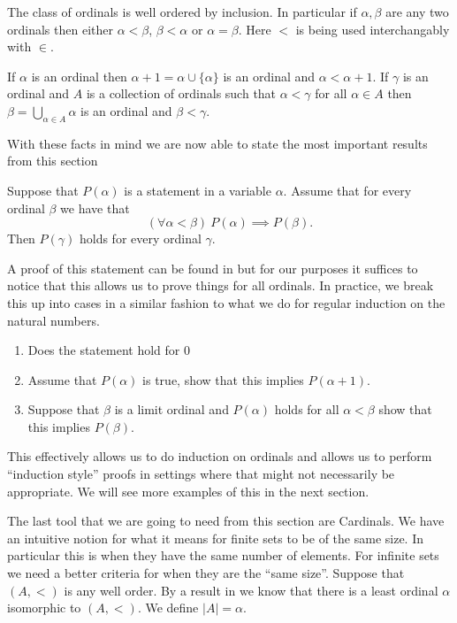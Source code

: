\begin{lemma}
  The class of ordinals is well ordered by inclusion. In particular if
  $\alpha, \beta$ are any two ordinals then either $\alpha < \beta$, $\beta
  < \alpha$ or $\alpha = \beta$. Here $<$ is being used interchangably with
  $\in$.
\end{lemma}

\begin{lemma}
  If $\alpha$ is an ordinal then $\alpha + 1 = \alpha \cup \{\alpha\}$ is an
  ordinal and $\alpha < \alpha + 1$. If $\gamma$ is an ordinal and $A$ is
  a collection of ordinals such that $\alpha < \gamma$ for all $\alpha \in A$ 
  then $\beta = \bigcup_{\alpha \in A} \alpha$ is an ordinal and $\beta
  < \gamma$.
\end{lemma}

With these facts in mind we are now able to state the most important results
from this section

\begin{thm}
  Suppose that $P(\alpha)$ is a statement in a variable $\alpha$. Assume that
  for every ordinal $\beta$ we have that
   \[
     (\forall \alpha < \beta)\  P(\alpha) \implies P(\beta)
  .\] 
  Then $P(\gamma)$ holds for every ordinal $\gamma$.
\end{thm}

A proof of this statement can be found in \cite{Schimmerling2011-li} but for our
purposes it suffices to notice that this allows us to prove things for all
ordinals. In practice, we break this up into cases in a similar fashion to what
we do for regular induction on the natural numbers.

\begin{enumerate}
  \item Does the statement hold for $0$
  \item Assume that $P(\alpha)$ is true, show that this implies  $P(\alpha + 1)$.
  \item Suppose that $\beta$ is a limit ordinal and $P(\alpha)$ holds for all
    $\alpha < \beta$ show that this implies $P(\beta)$.
\end{enumerate}

This effectively allows us to do induction on ordinals and allows us to perform
``induction style'' proofs in settings where that might not necessarily be
appropriate. We will see more examples of this in the next section.

The last tool that we are going to need from this section are Cardinals. We
have an intuitive notion for what it means for finite sets to be of the same
size. In particular this is when they have the same number of elements. For
infinite sets we need a better criteria for when they are the ``same size''.
Suppose that $(A, <)$ is any well order. By a result in
\cite{Schimmerling2011-li} we know that there is a least ordinal $\alpha$ 
isomorphic to $(A, <)$. We define $|A| = \alpha$.

